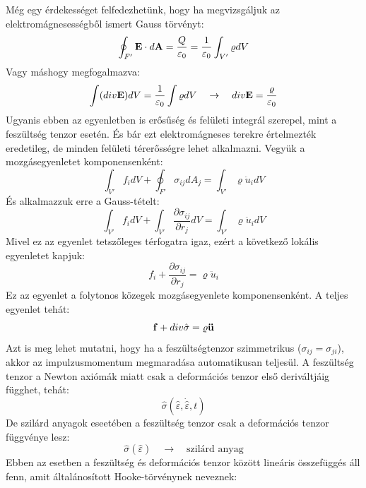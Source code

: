 \documentclass[a4paper,12pt]{article}
\begin{document}
Még egy érdekességet felfedezhetünk, hogy ha megvizsgáljuk az elektromágnesességből ismert Gauss törvényt:
\begin{equation}
    \oint_{F'} \bold{E} \cdot d\bold{A} = \frac{Q}{\varepsilon_0} = \frac{1}{\varepsilon_0} \int_{V'} \varrho dV
\end{equation}
Vagy máshogy megfogalmazva:
\begin{equation}
    \int (div \bold{E}) dV = \frac{1}{\varepsilon_0} \int \varrho dV \quad \rightarrow \quad div \bold{E} = \frac{\varrho}{\varepsilon_0}
\end{equation}
Ugyanis ebben az egyenletben is erősűség és felületi integrál szerepel, mint a feszültség tenzor esetén. És bár ezt elektromágneses terekre
értelmezték eredetileg, de minden felületi térerősségre lehet alkalmazni. Vegyük a mozgásegyenletet komponensenként:
\begin{equation}
    \int_{V'} f_i dV + \oint_{F'} \sigma_{ij} dA_j = \int_{V'} \varrho \ddot{u}_i dV
\end{equation}
És alkalmazzuk erre a Gauss-tételt:
\begin{equation}
    \int_{V'} f_i dV + \int_{V'} \frac{\partial \sigma_{ij}}{\partial r_j} dV = \int_{V'} \varrho \ddot{u}_i dV
\end{equation}
Mivel ez az egyenlet tetszőleges térfogatra igaz, ezért a következő lokális egyenletet kapjuk:
\begin{equation}
    f_i + \frac{\partial \sigma_{ij}}{\partial r_j} = \varrho \ddot{u}_i
\end{equation}
Ez az egyenlet a folytonos közegek mozgásegyenlete komponensenként. 
A teljes egyenlet tehát:
\begin{equation}
    \bold{f} + div \hat{\sigma} = \varrho \bold{\ddot{u}}
\end{equation}
Azt is meg lehet mutatni, hogy ha a feszültségtenzor szimmetrikus ($\sigma_{ij} = \sigma_{ji}$), akkor az impulzusmomentum megmaradása automatikusan teljesül.
A feszültség tenzor a Newton axiómák miatt csak a deformációs tenzor első deriváltjáig függhet, tehát: 
\begin{equation}
    \hat{\sigma}(\hat{\varepsilon}, \dot{\hat{\varepsilon}}, t)
\end{equation}
De szilárd anyagok eseetében a feszültség tenzor csak a deformációs tenzor függvénye lesz:
\begin{equation}
    \hat{\sigma}(\hat{\varepsilon}) \quad \rightarrow \quad \text{szilárd anyag}
\end{equation}
Ebben az esetben a feszültség és deformációs tenzor között lineáris összefüggés áll fenn, amit általánosított Hooke-törvénynek neveznek:
\end{document}
